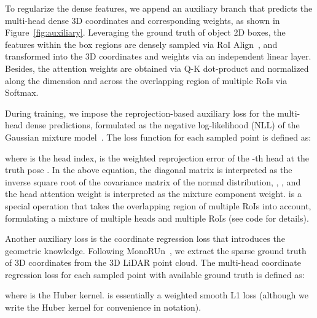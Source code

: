 \documentclass[10pt,twocolumn,letterpaper]{article}
\begin{document}
To regularize the dense features, we append an auxiliary branch that predicts the multi-head dense 3D coordinates and corresponding weights, as shown in Figure~\ref{fig:auxiliary}. Leveraging the ground truth of object 2D boxes, the features within the box regions are densely sampled via RoI Align~\cite{maskrcnn}, and transformed into the 3D coordinates  and weights  via an independent linear layer. Besides, the attention weights  are obtained via Q-K dot-product and normalized along the  dimension and across the overlapping region of multiple RoIs via Softmax. 

During training, we impose the reprojection-based auxiliary loss for the multi-head dense predictions, formulated as the negative log-likelihood (NLL) of the Gaussian mixture model~\cite{Bishop94mixturedensity}. The loss function for each sampled point is defined as:
\vspace{-1ex}

where  is the head index,  is the weighted reprojection error of the -th head at the truth pose . In the above equation, the diagonal matrix  is interpreted as the inverse square root of the covariance matrix of the normal distribution, \ie, , and the head attention weight  is interpreted as the mixture component weight.  is a special operation that takes the overlapping region of multiple RoIs into account, formulating a mixture of multiple heads and multiple RoIs (see code for details).

Another auxiliary loss is the coordinate regression loss that introduces the geometric knowledge. Following MonoRUn~\cite{monorun}, we extract the sparse ground truth of 3D coordinates  from the 3D LiDAR point cloud. The multi-head coordinate regression loss for each sampled point with available ground truth is defined as:

where  is the Huber kernel.  is essentially a weighted smooth L1 loss (although we write the Huber kernel for convenience in notation).
\end{document}
